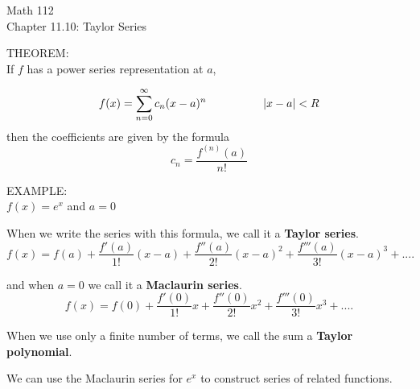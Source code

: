 \documentclass[11pt]{article}
\begin{document}
\begin{center}
\Large
\rm{Math 112}
\\
\rm{Chapter 11.10:  Taylor Series}
\\
\end{center}
\vspace{0.2in}

THEOREM: \\

If $f$ has a power series representation at $a$, 

\begin{displaymath}
f(x) =\sum_{n=0}^{\infty}c_n(x-a)^n  \hspace{0.7in} |x-a|<R
  \end{displaymath}
then the coefficients are given by the formula
\begin{displaymath}
c_n=\frac{f^{(n)}(a)}{n!}
  \end{displaymath}

\vspace{0.2in}

EXAMPLE:\\

$f(x) = e^x$ and $a=0$

\vspace{3in}

When we write the series with this formula, we call it a  {\bf Taylor series}.\\

\begin{displaymath}
f(x) = f(a) + \frac{f'(a)}{1!}(x-a) + \frac{f''(a)}{2!}(x-a)^2 + \frac{f'''(a)}{3!}(x-a)^3 + .... 
  \end{displaymath}

and when $a=0$ we call it a {\bf Maclaurin series}.\\

\begin{displaymath}
f(x) = f(0) + \frac{f'(0)}{1!}x + \frac{f''(0)}{2!}x^2 + \frac{f'''(0)}{3!}x^3 + .... 
  \end{displaymath}


\pagebreak

When we use only a finite number of terms, we call the sum a {\bf Taylor polynomial}.\\

\vspace{3in}


We can use the Maclaurin series for $e^x$ to construct series of related functions.\\
\end{document}
